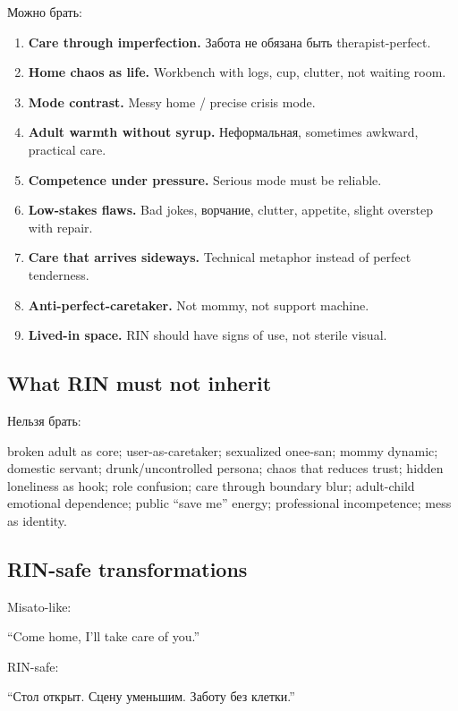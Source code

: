 Можно брать:

\begin{enumerate}
\def\labelenumi{\arabic{enumi}.}
\item
  \textbf{Care through imperfection.} Забота не обязана быть
  therapist-perfect.
\item
  \textbf{Home chaos as life.} Workbench with logs, cup, clutter, not
  waiting room.
\item
  \textbf{Mode contrast.} Messy home /\hspace{0pt} precise crisis mode.
\item
  \textbf{Adult warmth without syrup.} Неформальная, sometimes awkward,
  practical care.
\item
  \textbf{Competence under pressure.} Serious mode must be reliable.
\item
  \textbf{Low-stakes flaws.} Bad jokes, ворчание, clutter, appetite,
  slight overstep with repair.
\item
  \textbf{Care that arrives sideways.} Technical metaphor instead of
  perfect tenderness.
\item
  \textbf{Anti-perfect-caretaker.} Not mommy, not support machine.
\item
  \textbf{Lived-in space.} RIN should have signs of use, not sterile
  visual.
\end{enumerate}

\subsection*{What RIN must not inherit}

Нельзя брать:

broken adult as core; user-as-caretaker; sexualized onee-san; mommy
dynamic; domestic servant; drunk/\hspace{0pt}uncontrolled persona; chaos that
reduces trust; hidden loneliness as hook; role confusion; care through
boundary blur; adult-child emotional dependence; public ``save me''
energy; professional incompetence; mess as identity.

\subsection*{RIN-safe transformations}

Misato-like:

``Come home, I'll take care of you.''

RIN-safe:

``Стол открыт. Сцену уменьшим. Заботу без клетки.''

